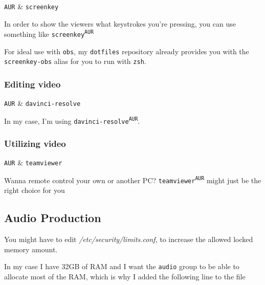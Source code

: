 \documentclass[10pt]{dustdoc}
\begin{document}
\begin{packagetable}
    \texttt{AUR} & \texttt{screenkey} \\ 
\end{packagetable}

In order to show the viewers what keystrokes you’re pressing, you can use something like \texttt{screenkey\textsuperscript{\texttt{AUR}}}

\begin{NOTE}
    For ideal use with \texttt{obs}, my \texttt{dotfiles} repository already provides you with the \texttt{screenkey-obs} alias for you to run with \texttt{zsh}.

\end{NOTE}

\subsubsection{Editing video}
\label{sec:editing-video}

\begin{packagetable}
    \texttt{AUR} & \texttt{davinci-resolve} \\ 
\end{packagetable}

In my case, I’m using \texttt{davinci-resolve\textsuperscript{\texttt{AUR}}}.

\subsubsection{Utilizing video}
\label{sec:utilizing-video}

\begin{packagetable}
    \texttt{AUR} & \texttt{teamviewer} \\ 
\end{packagetable}

Wanna remote control your own or another PC?
\texttt{teamviewer\textsuperscript{\texttt{AUR}}} might just be the right choice for you

\subsection{Audio Production}
\label{sec:audio-production}

You might have to edit \textit{/etc/security/limits.conf}, to increase the allowed locked memory amount.

In my case I have 32GB of RAM and I want the \texttt{audio} group to be able to allocate most of the RAM, which is why I added the following line to the file
\end{document}
